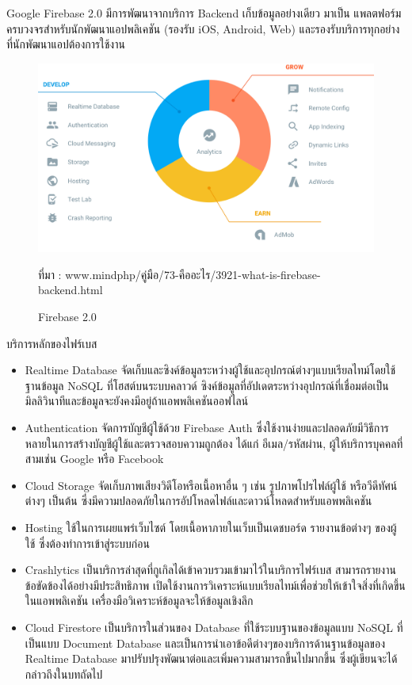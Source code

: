 	Google Firebase 2.0 มีการพัฒนาจากบริการ Backend เก็บข้อมูลอย่างเดียว มาเป็น แพลตฟอร์มครบวงจรสำหรับนักพัฒนาแอปพลิเคชัน (รองรับ iOS, Android, Web) และรองรับบริการทุกอย่างที่นักพัฒนาแอปต้องการใช้งาน
	
	\begin{figure}[H]
		\centering
		\includegraphics[width=\columnwidth]{Figures/2/firebase}
		\caption{Firebase 2.0}{ที่มา : www.mindphp/คู่มือ/73-คืออะไร/3921-what-is-firebase-backend.html}
		\label{Fig:class1}
	\end{figure}

บริการหลักของไฟร์เบส

\begin{itemize}
	\item Realtime Database จัดเก็บและซิงค์ข้อมูลระหว่างผู้ใช้และอุปกรณ์ต่างๆแบบเรียลไทม์โดยใช้ฐานข้อมูล NoSQL ที่โฮสต์บนระบบคลาวด์ ซิงค์ข้อมูลที่อัปเดตระหว่างอุปกรณ์ที่เชื่อมต่อเป็นมิลลิวินาทีและข้อมูลจะยังคงมีอยู่ถ้าแอพพลิเคชันออฟไลน์
	\item Authentication จัดการบัญชีผู้ใช้ด้วย Firebase Auth ซึ่งใช้งานง่ายและปลอดภัยมีวิธีการหลายในการสร้างบัญชีผู้ใช้และตรวจสอบความถูกต้อง ได้แก่ อีเมล/รหัสผ่าน, ผู้ให้บริการบุคคลที่สามเช่น Google หรือ Facebook 
	\item Cloud Storage จัดเก็บภาพเสียงวิดีโอหรือเนื้อหาอื่น ๆ เช่น รูปภาพโปรไฟล์ผู้ใช้ หรือวีดีทัศน์ต่างๆ เป็นต้น ซึ่งมีความปลอดภัยในการอัปโหลดไฟล์และดาวน์โหลดสำหรับแอพพลิเคชัน
	\item Hosting ใช้ในการเผยแพร่เว็บไซต์  โดยเนื้อหาภายในเว็บเป็นเดชบอร์ด รายงานข้อต่างๆ ของผู้ใช้ ซึ่งต้องทำการเข้าสู่ระบบก่อน
	\item Crashlytics เป็นบริการล่าสุดที่กูเกิลได้เข้าควบรวมเข้ามาไว้ในบริการไฟร์เบส สามารถรายงานข้อขัดข้องได้อย่างมีประสิทธิภาพ เปิดใช้งานการวิเคราะห์แบบเรียลไทม์เพื่อช่วยให้เข้าใจสิ่งที่เกิดขึ้นในแอพพลิเคชัน เครื่องมือวิเคราะห์ข้อมูลจะให้ข้อมูลเชิงลึก
	\item Cloud Firestore เป็นบริการในส่วนของ Database ที่ใช้ระบบฐานของข้อมูลแบบ NoSQL ที่เป็นแบบ Document Database และเป็นการนำเอาข้อดีต่างๆของบริการด้านฐานข้อมูลของ Realtime Database มาปรับปรุงพัฒนาต่อและเพิ่มความสามารถขึ้นไปมากขึ้น ซึ่งผู้เขียนจะได้กล่าวถึงในบทถัดไป
\end{itemize}

